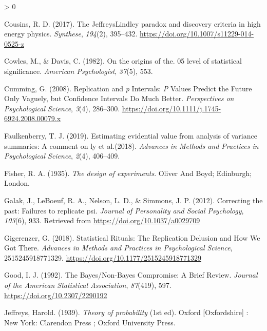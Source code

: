 \documentclass[
  english,
  ,man,floatsintext]{apa6}
\newlength{\cslhangindent}
\newenvironment{CSLReferences}[2] %
 {%
  \setlength{\parindent}{0pt}
  \ifodd #1 \everypar{\setlength{\hangindent}{\cslhangindent}}\ignorespaces\fi
  \ifnum #2 > 0
  \setlength{\parskip}{#2\baselineskip}
  \fi
 }%
 {}
\begin{document}
\begin{CSLReferences}{1}{0}
\leavevmode\hypertarget{ref-cousins_jeffreyslindley_2017}{}%
Cousins, R. D. (2017). The {Jeffreys}{{Lindley}} paradox and discovery criteria in high energy physics. \emph{Synthese}, \emph{194}(2), 395--432. \url{https://doi.org/10.1007/s11229-014-0525-z}

\leavevmode\hypertarget{ref-cowles_origins_1982}{}%
Cowles, M., \& Davis, C. (1982). On the origins of the. 05 level of statistical significance. \emph{American Psychologist}, \emph{37}(5), 553.

\leavevmode\hypertarget{ref-cumming_replication_2008}{}%
Cumming, G. (2008). Replication and {\emph{p}} {Intervals}: {\emph{P}} {Values Predict} the {Future Only Vaguely}, but {Confidence Intervals Do Much Better}. \emph{Perspectives on Psychological Science}, \emph{3}(4), 286--300. \url{https://doi.org/10.1111/j.1745-6924.2008.00079.x}

\leavevmode\hypertarget{ref-faulkenberry2019estimating}{}%
Faulkenberry, T. J. (2019). Estimating evidential value from analysis of variance summaries: A comment on ly et al.(2018). \emph{Advances in Methods and Practices in Psychological Science}, \emph{2}(4), 406--409.

\leavevmode\hypertarget{ref-fisher_design_1935}{}%
Fisher, R. A. (1935). \emph{The design of experiments}. {Oliver And Boyd; Edinburgh; London}.

\leavevmode\hypertarget{ref-galak2012correcting}{}%
Galak, J., LeBoeuf, R. A., Nelson, L. D., \& Simmons, J. P. (2012). Correcting the past: Failures to replicate {p}si. \emph{Journal of Personality and Social Psychology}, \emph{103}(6), 933. Retrieved from \url{https://doi.org/10.1037/a0029709}

\leavevmode\hypertarget{ref-gigerenzer_statistical_2018}{}%
Gigerenzer, G. (2018). Statistical {Rituals}: {The Replication Delusion} and {How We Got There}. \emph{Advances in Methods and Practices in Psychological Science}, 2515245918771329. \url{https://doi.org/10.1177/2515245918771329}

\leavevmode\hypertarget{ref-good_bayesux2fnon-bayes_1992}{}%
Good, I. J. (1992). The {Bayes}/{Non}-{Bayes Compromise}: {A Brief Review}. \emph{Journal of the American Statistical Association}, \emph{87}(419), 597. \url{https://doi.org/10.2307/2290192}

\leavevmode\hypertarget{ref-jeffreys_theory_1939}{}%
Jeffreys, Harold. (1939). \emph{Theory of probability} (1st ed). {Oxford {[}Oxfordshire{]} : New York}: {Clarendon Press ; Oxford University Press}.


\end{CSLReferences}
\end{document}
